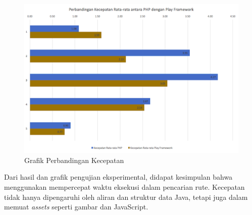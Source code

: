 \begin{figure}[H]
	\centering
	\includegraphics[scale=0.4]{Gambar/grafik-eksperimental}
	\caption{Grafik Perbandingan Kecepatan} 
	\label{fig:5_grafik_eksperimental}
\end{figure}

Dari hasil dan grafik pengujian eksperimental, didapat kesimpulan bahwa menggunakan \play mempercepat waktu eksekusi dalam pencarian rute. Kecepatan \play tidak hanya dipengaruhi oleh aliran dan struktur data Java, tetapi juga dalam memuat \textit{assets} seperti gambar dan JavaScript.